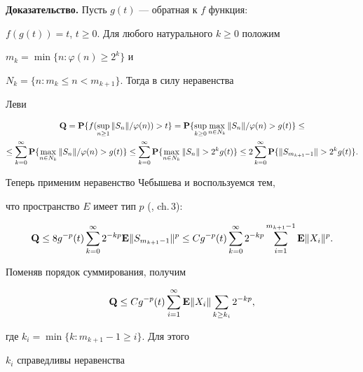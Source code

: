 {\bf Доказательство.} Пусть $g(t)$ --- обратная к $f$ функция:


$f(g(t))= t$, $t\ge 0$. Для любого натурального $k\ge 0$ положим


$m_{k} =\min \{n:\varphi (n)\ge 2^{k} \}$ и


$N_{k} =\{n: m_{k} \le n<m_{k+1} \}$. Тогда в силу неравенства


Леви


\begin{multline*}


{\bold Q} = {\bold P} \{f(\sup_{n\ge 1}\|S_{n} \|


/\varphi (n))>t\}={\bold P} \{\sup_{k\ge 0}


\max_{n\in N_k} \|S_{n} \|/\varphi (n)>g(t)\}\le \\


%


\le \sum^{\infty }_{k=0}{\bold P} \{\max_{n\in N_k}


\|S_{n} \|/\varphi (n)> g(t)\}


\le \sum^{\infty }_{k=0} {\bold P} \{\max_{n\in N_k}


\|S_{n} \|> 2^{k} g(t)\}


\le 2\sum^{\infty }_{k=0} {\bold P} \{\|S_{m_{k+1} -1}\|> 2^{k} g(t)\}.


\end{multline*}


Теперь применим неравенство Чебышева и воспользуемся тем,


что пространство $E$ имеет тип $p$ (\cite{Pis}, ch.\,3):


$$


{\bold Q} \le 8g^{-p} (t)\sum^{\infty }_{k=0} 2^{-kp}


{\bold E} \|S_{m_{k+1} -1} \|^{p} \le Cg^{-p} (t)


\sum^{\infty }_{k=0} 2^{-kp}\sum^{m_{k+1} -1}_{i=1}


{\bold E}\|X_{i} \|^{p}.


$$


Поменяв порядок суммирования, получим


$$


{\bold Q} \le Cg^{-p} (t)\sum^{\infty }_{i=1}


{\bold E} \| X_{i} \| \sum_{k\ge k_{i} }


2^{-kp},


$$


где $k_{i} =\min \{k: m_{k+1} -1\ge i\}$. Для этого


$k_{i} $ справедливы неравенства


